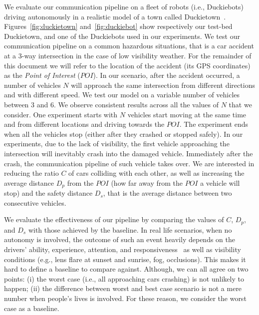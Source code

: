 We evaluate our communication pipeline on a fleet of robots (i.e., Duckiebots) driving autonomously in a 
realistic model of a town called Duckietown~\cite{paull2017duckietown}. Figures~\ref{fig:duckietown} 
and~\ref{fig:duckiebot} show respectively our test-bed Duckietown, and one of the Duckiebots used in our 
experiments.
We test our communication pipeline on a common hazardous situations, that is a car accident at a 3-way 
intersection in the case of low visibility weather. For the remainder of this document we will refer to the location of
the accident (its GPS coordinates) as the \textit{Point of Interest} ($POI$). 
In our scenario, after the accident occurred, a number of 
vehicles $N$ will approach the same intersection from different directions and with different speed.
We test our model on a variable number of vehicles between $3$ and $6$. We observe consistent 
results across all the values of $N$ that we consider.
One experiment starts with $N$ vehicles start moving at the same time and from different locations and
driving towards the $POI$. The experiment ends when all the vehicles stop (either after they crashed
or stopped safely).
In our experiments, due to the lack of visibility, the first vehicle approaching the intersection will inevitably crash 
into the damaged vehicle. Immediately after the crash, the communication pipeline of such vehicle takes over.
We are interested in reducing the ratio $C$ of cars colliding with each other, as well as increasing 
the average distance $D_p$ from the $POI$ (how far away from the $POI$ a vehicle will stop) and the safety 
distance $D_s$, that is the average distance between two consecutive vehicles.

We evaluate the effectiveness of our pipeline by comparing the values of $C$, $D_p$, and $D_s$ 
with those achieved by the baseline.
In real life scenarios, when no autonomy is involved, 
the outcome of such an event heavily depends on the drivers' ability, experience, attention, and 
responsiveness~ as well as visibility conditions (e.g., lens flare at sunset and 
sunrise, fog, occlusions). This makes it hard to define
a baseline to compare against. Although, we can all agree on two points: (i) the worst case (i.e., all approaching 
cars crashing) is not unlikely to happen; (ii) the difference between worst and best case scenario is not a mere 
number when people's lives is involved. For these reason, we consider the worst case as a baseline.

